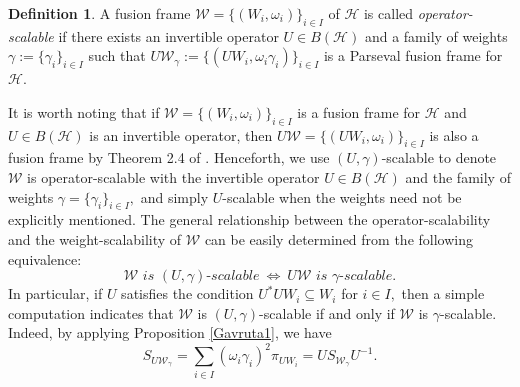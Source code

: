 \documentclass[sn-mathphys-num]{sn-jnl}%
\theoremstyle{definition}
\newtheorem{definition}[theorem]{Definition}
\theoremstyle{remark}
\numberwithin{equation}{section}
\begin{document}
\begin{definition}
A fusion frame $\mathcal{W}=\{(W_{i},\omega_{i})\}_{i \in I} $ of $\mathcal {H}$ is called \textit{operator-scalable} if there exists an invertible operator $U\in{B(\mathcal{H})}$ and a family of weights $ {\gamma}:=\{\gamma_{i}\}_{i \in I} $ such that $ U\mathcal{W}_{\gamma}:=\{(UW_{i},\omega_{i}\gamma_{i})\}_{i \in I} $ is a Parseval fusion frame for $\mathcal {H}$.
\end{definition}

It is worth noting that if $\mathcal{W}=\{(W_{i},\omega_{i})\}_{i \in I} $ is a fusion frame for $\mathcal {H}$ and $U\in{B(\mathcal{H})}$ is an invertible operator, then  $U\mathcal{W}=\{(UW_{i},\omega_{i})\}_{i \in I}$ is also a fusion frame by Theorem 2.4 of \cite{16}. Henceforth, we use $(U,\gamma)$-scalable to denote $\mathcal{W}$ is operator-scalable with the invertible operator $U\in{B(\mathcal{H})}$ and the family of weights $\gamma=\{\gamma_{i}\}_{i \in I},$ and simply $U$-scalable when the weights need not be explicitly mentioned. The general relationship between the operator-scalability and the weight-scalability of $\mathcal{W}$ can be easily determined from the following equivalence: 
\begin{equation}\label{ooo}
\mathcal{W} \textit{\ is \ } (U,\gamma)\textit{-scalable}~ \Leftrightarrow ~U\mathcal{W} \textit{\ is \ } \gamma\textit{-scalable}.
\end{equation}
In particular, if $U$ satisfies the condition $U^*UW_{i}\subseteq W_{i}$ for $i \in I,$ then a simple computation indicates that $\mathcal{W}$ is $(U,\gamma)$-scalable if and only if $\mathcal{W}$ is $\gamma$-scalable. Indeed, by applying Proposition \ref{Gavruta1}, we have
\begin{equation*}
S_{U\mathcal{W}_{\gamma}}=\sum_{i \in I}\left( \omega_{i}\gamma_{i}\right) ^2\pi_{UW_{i}}=US_{\mathcal{W}_{\gamma}}U^{-1}.
\end{equation*}
\end{document}
